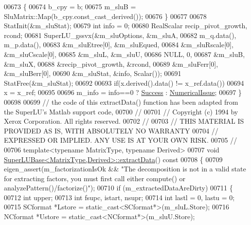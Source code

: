 \begin{DoxyCode}
00673   \{
00674     b\_cpy = b;
00675     m\_sluB = SluMatrix::Map(b\_cpy.const\_cast\_derived());  
00676   \}
00677 
00678   StatInit(&m\_sluStat);
00679   \textcolor{keywordtype}{int} info = 0;
00680   RealScalar recip\_pivot\_growth, rcond;
00681   SuperLU\_gssvx(&m\_sluOptions, &m\_sluA,
00682                 m\_q.data(), m\_p.data(),
00683                 &m\_sluEtree[0], &m\_sluEqued,
00684                 &m\_sluRscale[0], &m\_sluCscale[0],
00685                 &m\_sluL, &m\_sluU,
00686                 NULL, 0,
00687                 &m\_sluB, &m\_sluX,
00688                 &recip\_pivot\_growth, &rcond,
00689                 &m\_sluFerr[0], &m\_sluBerr[0],
00690                 &m\_sluStat, &info, Scalar());
00691   StatFree(&m\_sluStat);
00692   
00693   \textcolor{keywordflow}{if}(x.derived().data() != x\_ref.data())
00694     x = x\_ref;
00695   
00696   m\_info = info==0 ? \hyperlink{group__enums_gga85fad7b87587764e5cf6b513a9e0ee5ea52581b035f4b59c203b8ff999ef5fcea}{Success} : \hyperlink{group__enums_gga85fad7b87587764e5cf6b513a9e0ee5eaaf9b736d310a664e7729d163a035cc5f}{NumericalIssue};
00697 \}
00698 
00699 \textcolor{comment}{// the code of this extractData() function has been adapted from the SuperLU's Matlab support code,}
00700 \textcolor{comment}{//}
00701 \textcolor{comment}{//  Copyright (c) 1994 by Xerox Corporation.  All rights reserved.}
00702 \textcolor{comment}{//}
00703 \textcolor{comment}{//  THIS MATERIAL IS PROVIDED AS IS, WITH ABSOLUTELY NO WARRANTY}
00704 \textcolor{comment}{//  EXPRESSED OR IMPLIED.  ANY USE IS AT YOUR OWN RISK.}
00705 \textcolor{comment}{//}
00706 \textcolor{keyword}{template}<\textcolor{keyword}{typename} MatrixType, \textcolor{keyword}{typename} Derived>
00707 \textcolor{keywordtype}{void} \hyperlink{class_eigen_1_1_super_l_u_base}{SuperLUBase<MatrixType,Derived>::extractData}()\textcolor{keyword}{ const}
00708 \textcolor{keyword}{}\{
00709   eigen\_assert(m\_factorizationIsOk && \textcolor{stringliteral}{"The decomposition is not in a valid state for extracting factors,
       you must first call either compute() or analyzePattern()/factorize()"});
00710   \textcolor{keywordflow}{if} (m\_extractedDataAreDirty)
00711   \{
00712     \textcolor{keywordtype}{int}         upper;
00713     \textcolor{keywordtype}{int}         fsupc, istart, nsupr;
00714     \textcolor{keywordtype}{int}         lastl = 0, lastu = 0;
00715     SCformat    *Lstore = \textcolor{keyword}{static\_cast<}SCformat*\textcolor{keyword}{>}(m\_sluL.Store);
00716     NCformat    *Ustore = \textcolor{keyword}{static\_cast<}NCformat*\textcolor{keyword}{>}(m\_sluU.Store);

\end{DoxyCode}

